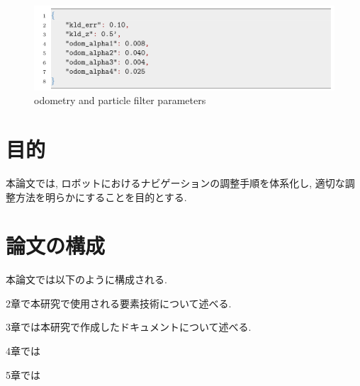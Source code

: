 \begin{figure}[hbtp]
  \centering
 \includegraphics[keepaspectratio, scale=0.3]
      {images/senkou_2.png}
 \caption{odometry and particle filter parameters}
 \label{Fig:odometry and particle filter parameters}
\end{figure}
\newpage
\section{目的}
本論文では, ロボットにおけるナビゲーションの調整手順を体系化し, 適切な調整方法を明らかにすることを目的とする. 

\section{論文の構成}
本論文では以下のように構成される. 

2章で本研究で使用される要素技術について述べる. 

3章では本研究で作成したドキュメントについて述べる. 

4章では

5章では

\newpage
